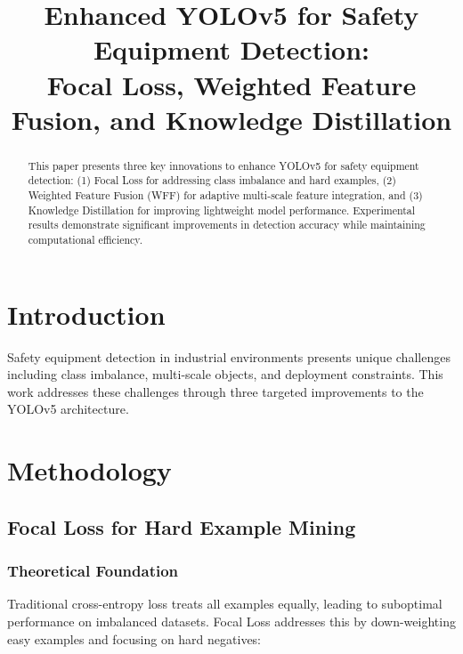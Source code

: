 \documentclass[journal]{IEEEtran}
\begin{document}
\title{Enhanced YOLOv5 for Safety Equipment Detection: \\
Focal Loss, Weighted Feature Fusion, and Knowledge Distillation}

\author{
}

\maketitle

\begin{abstract}
This paper presents three key innovations to enhance YOLOv5 for safety equipment detection: (1) Focal Loss for addressing class imbalance and hard examples, (2) Weighted Feature Fusion (WFF) for adaptive multi-scale feature integration, and (3) Knowledge Distillation for improving lightweight model performance. Experimental results demonstrate significant improvements in detection accuracy while maintaining computational efficiency.
\end{abstract}

\section{Introduction}

Safety equipment detection in industrial environments presents unique challenges including class imbalance, multi-scale objects, and deployment constraints. This work addresses these challenges through three targeted improvements to the YOLOv5 architecture.

\section{Methodology}

\subsection{Focal Loss for Hard Example Mining}

\subsubsection{Theoretical Foundation}

Traditional cross-entropy loss treats all examples equally, leading to suboptimal performance on imbalanced datasets. Focal Loss addresses this by down-weighting easy examples and focusing on hard negatives:
\end{document}
